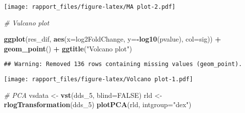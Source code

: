 \documentclass[]{article}
\newenvironment{Shaded}{\begin{snugshade}}{\end{snugshade}}
\newcommand{\KeywordTok}[1]{\textcolor[rgb]{0.13,0.29,0.53}{\textbf{#1}}}
\newcommand{\DataTypeTok}[1]{\textcolor[rgb]{0.13,0.29,0.53}{#1}}
\newcommand{\DecValTok}[1]{\textcolor[rgb]{0.00,0.00,0.81}{#1}}
\newcommand{\FloatTok}[1]{\textcolor[rgb]{0.00,0.00,0.81}{#1}}
\newcommand{\StringTok}[1]{\textcolor[rgb]{0.31,0.60,0.02}{#1}}
\newcommand{\CommentTok}[1]{\textcolor[rgb]{0.56,0.35,0.01}{\textit{#1}}}
\newcommand{\OtherTok}[1]{\textcolor[rgb]{0.56,0.35,0.01}{#1}}
\newcommand{\OperatorTok}[1]{\textcolor[rgb]{0.81,0.36,0.00}{\textbf{#1}}}
\newcommand{\NormalTok}[1]{#1}
\begin{document}
\begin{Shaded}
\end{Shaded}

\texttt{[image: rapport\_files/figure-latex/MA plot-2.pdf]}

\begin{Shaded}
\begin{Highlighting}[]
\CommentTok{# Vulcano plot}

\KeywordTok{ggplot}\NormalTok{(res_dif, }\KeywordTok{aes}\NormalTok{(}\DataTypeTok{x=}\NormalTok{log2FoldChange, }\DataTypeTok{y=}\OperatorTok{-}\KeywordTok{log10}\NormalTok{(pvalue), }\DataTypeTok{col=}\NormalTok{sig)) }\OperatorTok{+}
\StringTok{  }\KeywordTok{geom_point}\NormalTok{() }\OperatorTok{+}
\StringTok{  }\KeywordTok{ggtitle}\NormalTok{(}\StringTok{"Volcano plot"}\NormalTok{)}
\end{Highlighting}
\end{Shaded}

\begin{verbatim}
## Warning: Removed 136 rows containing missing values (geom_point).
\end{verbatim}

\texttt{[image: rapport\_files/figure-latex/Volcano plot-1.pdf]}

\begin{Shaded}
\begin{Highlighting}[]
\CommentTok{# PCA}
\NormalTok{vsdata <-}\StringTok{ }\KeywordTok{vst}\NormalTok{(dds_}\DecValTok{5}\NormalTok{, }\DataTypeTok{blind=}\OtherTok{FALSE}\NormalTok{)}
\NormalTok{rld <-}\StringTok{ }\KeywordTok{rlogTransformation}\NormalTok{(dds_}\DecValTok{5}\NormalTok{)}
\KeywordTok{plotPCA}\NormalTok{(rld, }\DataTypeTok{intgroup=}\StringTok{"dex"}\NormalTok{)}
\end{Highlighting}
\end{Shaded}
\end{document}
